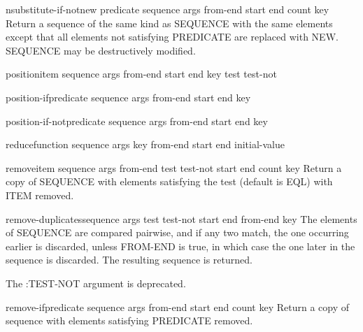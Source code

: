 \begin{function}{nsubstitute-if-not}{new predicate sequence \rest args \key from-end start end count key}{}{}
  Return a sequence of the same kind as SEQUENCE with the same elements
   except that all elements not satisfying PREDICATE are replaced with NEW.
   SEQUENCE may be destructively modified.
\end{function}

\begin{function}{position}{item sequence \rest args \key from-end start end key test test-not}{}{}
  
\end{function}

\begin{function}{position-if}{predicate sequence \rest args \key from-end start end key}{}{}
  
\end{function}

\begin{function}{position-if-not}{predicate sequence \rest args \key from-end start end key}{}{}
  
\end{function}

\begin{function}{reduce}{function sequence \rest args \key key from-end start end initial-value}{}{}
  
\end{function}

\begin{function}{remove}{item sequence \rest args \key from-end test test-not start end count key}{}{}
  Return a copy of SEQUENCE with elements satisfying the test (default is
   EQL) with ITEM removed.
\end{function}

\begin{function}{remove-duplicates}{sequence \rest args \key test test-not start end from-end key}{}{}
  The elements of SEQUENCE are compared pairwise, and if any two match,
   the one occurring earlier is discarded, unless FROM-END is true, in
   which case the one later in the sequence is discarded. The resulting
   sequence is returned.

   The :TEST-NOT argument is deprecated.
\end{function}

\begin{function}{remove-if}{predicate sequence \rest args \key from-end start end count key}{}{}
  Return a copy of sequence with elements satisfying PREDICATE removed.
\end{function}

